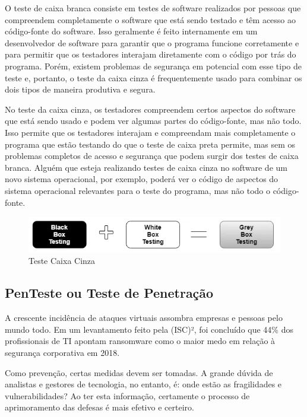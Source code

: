 O teste de caixa branca consiste em testes de software realizados por pessoas que compreendem completamente o software que está sendo testado e têm acesso ao código-fonte do software. Isso geralmente é feito internamente em um desenvolvedor de software para garantir que o programa funcione corretamente e para permitir que os testadores interajam diretamente com o código por trás do programa. Porém, existem problemas de segurança em potencial com esse tipo de teste e, portanto, o teste da caixa cinza é frequentemente usado para combinar os dois tipos de maneira produtiva e segura.

No teste da caixa cinza, os testadores compreendem certos aspectos do software que está sendo usado e podem ver algumas partes do código-fonte, mas não todo. Isso permite que os testadores interajam e compreendam mais completamente o programa que estão testando do que o teste de caixa preta permite, mas sem os problemas completos de acesso e segurança que podem surgir dos testes de caixa branca. Alguém que esteja realizando testes de caixa cinza no software de um novo sistema operacional, por exemplo, poderá ver o código de aspectos do sistema operacional relevantes para o teste do programa, mas não todo o código-fonte.

\begin{figure}[H]
    \centering
    \includegraphics[width=0.7\linewidth]{dados/figuras/grey}
    \caption{Teste Caixa Cinza}
    \label{fig:teste}
\end{figure}

\subsection{PenTeste ou Teste de Penetração}

A crescente incidência de ataques virtuais assombra empresas e pessoas pelo mundo todo. Em um levantamento feito pela (ISC)², foi concluído que 44\% dos profissionais de TI apontam ransomware como o maior medo em relação à segurança corporativa em 2018.

Como prevenção, certas medidas devem ser tomadas. A grande dúvida de analistas e gestores de tecnologia, no entanto, é: onde estão as fragilidades e vulnerabilidades? Ao ter esta informação, certamente o processo de aprimoramento das defesas é mais efetivo e certeiro.

